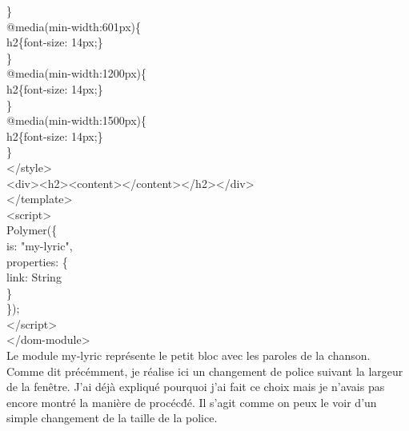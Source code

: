 \documentclass{article}
\begin{document}
{{\hspace*{1.8cm}\}	\\
\hspace*{1.8cm}@media(min-width:601px)\{\\
\hspace*{2.4cm}h2\{font-size: 14px;\}\\
\hspace*{1.8cm}\}\\	
\hspace*{1.8cm}@media(min-width:1200px)\{\\
\hspace*{2.4cm}h2\{font-size: 14px;\}\\
\hspace*{1.8cm}\}		\\
\hspace*{1.8cm}@media(min-width:1500px)\{\\
\hspace*{2.4cm}h2\{font-size: 14px;\}\\
\hspace*{1.8cm}\}	\\
\hspace*{1.2cm}</style>\\
\hspace*{1.2cm}<div><h2><content></content></h2></div>\\
\hspace*{0.6cm}</template>\\
\hspace*{0.6cm}<script>\\
\hspace*{1.2cm}Polymer(\{\\
\hspace*{1.8cm}is: "my-lyric", \\
\hspace*{1.8cm}properties: \{\\
\hspace*{2.4cm}link: String\\
\hspace*{1.8cm}\}\\
\hspace*{1.2cm}\});\\
\hspace*{0.6cm}</script> \\
</dom-module>
}}
\vspace{0.5cm}\\
Le module \og my-lyric \fg{} repr\'esente le petit bloc avec les paroles de la chanson. Comme dit pr\'ec\'emment, je r\'ealise ici un changement de police suivant la largeur de la fen\^etre. J'ai d\'ej\`a expliqu\'e pourquoi j'ai fait ce choix mais je n'avais pas encore montr\'e la mani\`ere de proc\'ec\'d\'e. Il s'agit comme on peux le voir d'un simple changement de la taille de la police.\\
\end{document}
